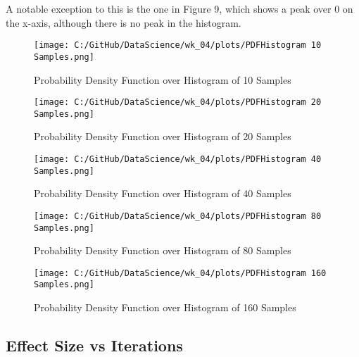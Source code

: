 \documentclass[a4paper,twocolumn]{article}
\begin{document}
A notable exception to this is the one in Figure 9, which shows a peak over 0 on the x-axis, although there is no
peak in the histogram.

\begin{figure}[htbp]
    \centering
    \begin{minipage}{0.45\textwidth}
        \centering
        \texttt{[image: C:/GitHub/DataScience/wk\_04/plots/PDFHistogram 10 Samples.png]}
        \caption{Probability Density Function over Histogram of 10 Samples} 
    \end{minipage} \hfill
    \begin{minipage}{0.45\textwidth}
        \centering
        \texttt{[image: C:/GitHub/DataScience/wk\_04/plots/PDFHistogram 20 Samples.png]}
        \caption{Probability Density Function over Histogram of 20 Samples} 
    \end{minipage} 

    \begin{minipage}{0.45\textwidth}
        \centering
        \texttt{[image: C:/GitHub/DataScience/wk\_04/plots/PDFHistogram 40 Samples.png]}
        \caption{Probability Density Function over Histogram of 40 Samples} 
    \end{minipage} 
\end{figure}

\newpage %

\begin{figure}[htbp]
    \centering
    \begin{minipage}{0.45\textwidth}
        \centering
        \texttt{[image: C:/GitHub/DataScience/wk\_04/plots/PDFHistogram 80 Samples.png]}
        \caption{Probability Density Function over Histogram of 80 Samples} 
    \end{minipage} 

    \begin{minipage}{0.45\textwidth}
        \centering
        \texttt{[image: C:/GitHub/DataScience/wk\_04/plots/PDFHistogram 160 Samples.png]}
        \caption{Probability Density Function over Histogram of 160 Samples} 
    \end{minipage}
\end{figure}

\subsection{Effect Size vs Iterations}
\end{document}
